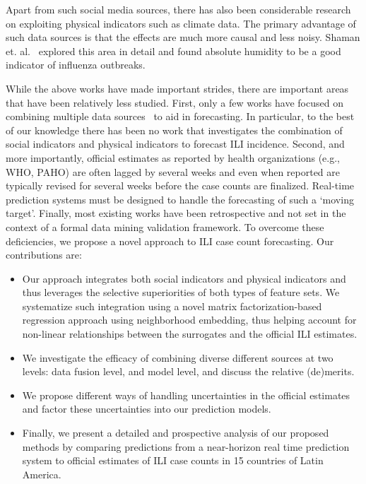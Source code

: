 Apart from such social media sources,
there has also been considerable research on 
exploiting physical indicators such as climate data.
The primary advantage of such data sources is that the
effects are much more causal and less noisy. 
Shaman et. al.~\cite{ref9, Shaman_orig_humidity_link, Shaman_humidity_USA} 
explored this area in detail and found absolute humidity 
to be a good indicator of influenza outbreaks.

While the above works have made important strides, there are important areas that
have been relatively less studied. First, 
only a few works have focused on combining multiple data sources~\cite{ref10, ref3}
to aid in forecasting. In particular, to the best of our knowledge there has been no work
that investigates the combination of social indicators and physical indicators to forecast
ILI incidence. Second, and more importantly, official estimates as reported by health
organizations (e.g., WHO, PAHO) are often lagged by several weeks and
even when reported are typically revised for several weeks before the case counts are
finalized. Real-time prediction systems must be designed to handle the forecasting of
such a `moving target'. Finally, most existing works have been retrospective and not set in
the context of a formal data mining validation framework. To overcome these deficiencies, we
propose a novel approach to ILI case count forecasting. Our contributions are:
\vspace{-1em}
\begin{itemize}
  \item Our approach integrates both social indicators and physical indicators and thus
leverages the selective superiorities of both types of feature sets. We systematize such
integration using a novel matrix factorization-based regression approach
using neighborhood embedding, thus helping account for 
non-linear relationships between the surrogates and the official ILI estimates.
  \item We investigate the efficacy of combining diverse different sources at two
levels: data fusion level, and model level, and discuss the relative (de)merits.
  \item We propose different ways of handling uncertainties in the official 
    estimates and factor these uncertainties into our prediction models.
  \item Finally, we present a detailed and prospective analysis of our proposed methods
    by comparing predictions from a near-horizon real time prediction system to 
    official estimates of ILI case counts in 15 countries of Latin America.
\end{itemize}

